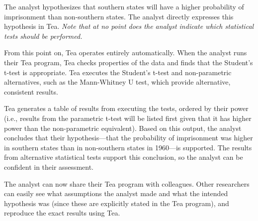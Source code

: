 The analyst hypothesizes that southern states will have a higher
probability of imprisonment than non-southern states. The analyst
directly expresses this hypothesis in Tea.  \emph{Note that at no
  point does the analyst indicate which statistical tests should be
  performed.}

From this point on, Tea operates entirely automatically.  When the
analyst runs their Tea program, Tea checks properties of the data and
finds that the Student's t-test is appropriate. Tea executes the Student's
t-test and non-parametric alternatives, such as the Mann-Whitney U
test, which provide alternative, consistent results.

Tea generates a table of results from executing the tests, ordered by their
power (i.e., results from the parametric t-test will be listed first
given that it has higher power than the non-parametric
equivalent). Based on this output, the analyst concludes that their
hypothesis---that the probability of imprisonment was higher in
southern states than in non-southern states in 1960---is
supported. The results from alternative statistical tests support this
conclusion, so the analyst can be confident in their assessment.


The analyst can now share their Tea program with colleagues.  Other
researchers can easily see what assumptions the analyst made and what
the intended hypothesis was (since these are explicitly stated in the
Tea program), and reproduce the exact results using Tea.


